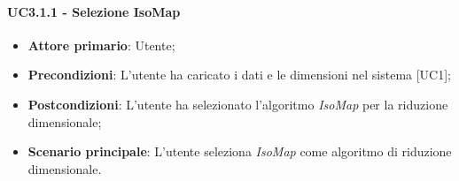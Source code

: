\paragraph{UC3.1.1 - Selezione IsoMap}
\begin{itemize}
	\item \textbf{Attore primario}: Utente;
	\item \textbf{Precondizioni}: L'utente ha caricato i dati e le dimensioni nel sistema [UC1];
	\item \textbf{Postcondizioni}: L'utente ha selezionato l'algoritmo \textit{IsoMap} per la riduzione dimensionale;
	\item \textbf{Scenario principale}: L'utente seleziona \textit{IsoMap} come algoritmo di riduzione dimensionale.
\end{itemize}
